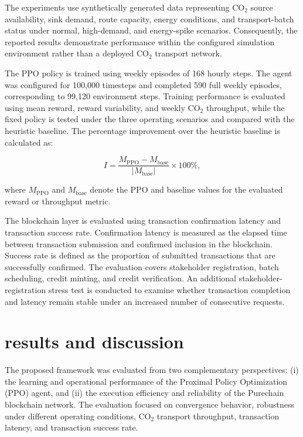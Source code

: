 \documentclass[conference]{IEEEtran}
\begin{document}
The experiments use synthetically generated data representing CO$_2$ source availability, sink demand, route capacity, energy conditions, and transport-batch status under normal, high-demand, and energy-spike scenarios. Consequently, the
reported results demonstrate performance within the configured simulation environment rather than a deployed CO$_2$ transport network.

The PPO policy is trained using weekly episodes of 168 hourly steps. The agent was configured for 100,000 timesteps and completed 590 full weekly episodes, corresponding to 99,120 environment steps. Training performance is evaluated using mean reward, reward variability, and weekly CO$_2$ throughput, while the fixed policy is tested under the three operating scenarios and compared with the heuristic baseline. The percentage improvement over the heuristic baseline is calculated as:

\vspace{-0.3cm}
\begin{equation}
I =
\frac{M_{\mathrm{PPO}}-M_{\mathrm{base}}}
{\left|M_{\mathrm{base}}\right|}
\times 100\%,
\label{eq:performance_improvement}
\end{equation}

\vspace{-0.2cm}
where $M_{\mathrm{PPO}}$ and $M_{\mathrm{base}}$ denote the PPO and baseline values for the evaluated reward or throughput metric.

The blockchain layer is evaluated using transaction confirmation latency and transaction success rate. Confirmation latency is measured as the elapsed time
between transaction submission and confirmed inclusion in the blockchain. Success rate is defined as the proportion of submitted transactions that are successfully confirmed. The evaluation covers stakeholder registration, batch scheduling, credit minting, and credit verification. An additional stakeholder-registration stress test is conducted to examine whether transaction completion and latency remain stable under an increased number of consecutive requests.


\section{\textbf{results and discussion}}
\label{sec:results}

The proposed framework was evaluated from two complementary perspectives: (i) the learning and operational performance of the Proximal Policy Optimization (PPO) agent, and (ii) the execution efficiency and reliability of the Purechain blockchain network. The evaluation focused on convergence behavior, robustness under different operating conditions, CO$_2$ transport throughput, transaction latency, and transaction success rate.
\end{document}
